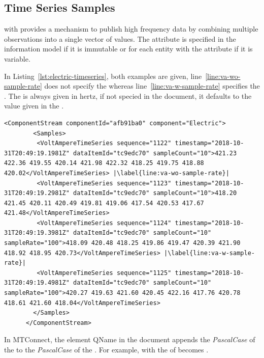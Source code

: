 \subsection{Time Series Samples}

 with   provides a mechanism to publish high frequency data by combining multiple observations into a single vector of values. The attribute  is specified in the  information model if it is immutable or for each entity with the attribute  if it is variable. 

In Listing~\ref{lst:electric-timeseries}, both examples are given, line~\ref{line:va-wo-sample-rate} does not specify the  whereas line~\ref{line:va-w-sample-rate} specifies the . The  is always given in hertz, if not specied in the  document, it defaults to the value given in the .

\begin{lstlisting}[firstnumber=last,escapechar=|,%
    caption={Electric Component Time Series Example},label={lst:electric-timeseries}]
      <ComponentStream componentId="afb91ba0" component="Electric">
        <Samples>
         <VoltAmpereTimeSeries sequence="1122" timestamp="2018-10-31T20:49:19.1981Z" dataItemId="tc9edc70" sampleCount="10">421.23 422.36 419.55 420.14 421.98 422.32 418.25 419.75 418.88 420.02</VoltAmpereTimeSeries> |\label{line:va-wo-sample-rate}|
         <VoltAmpereTimeSeries sequence="1123" timestamp="2018-10-31T20:49:19.2981Z" dataItemId="tc9edc70" sampleCount="10">418.20 421.45 420.11 420.49 419.81 419.06 417.54 420.53 417.67 421.48</VoltAmpereTimeSeries>
         <VoltAmpereTimeSeries sequence="1124" timestamp="2018-10-31T20:49:19.3981Z" dataItemId="tc9edc70" sampleCount="10" sampleRate="100">418.09 420.48 418.25 419.86 419.47 420.39 421.90 418.92 418.95 420.73</VoltAmpereTimeSeries> |\label{line:va-w-sample-rate}|
         <VoltAmpereTimeSeries sequence="1125" timestamp="2018-10-31T20:49:19.4981Z" dataItemId="tc9edc70" sampleCount="10" sampleRate="100">420.27 419.63 421.60 420.45 422.16 417.76 420.78 418.61 421.60 418.04</VoltAmpereTimeSeries>
        </Samples>
      </ComponentStream>
\end{lstlisting}

In MTConnect, the  element QName in the  document appends the \textit{PascalCase} of the  to the \textit{PascalCase} of the . For example,   with the  of  becomes . 

